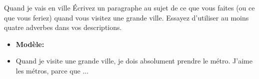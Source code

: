 \begin{frame}{Quand je vais en ville}
  Écrivez un paragraphe au sujet de ce que vous faites (ou ce que vous feriez) quand vous visitez une grande ville.
  Essayez d'utiliser au moins  quatre \alert{adverbes} dans vos descriptions.
  \begin{itemize}
    \item[] \textbf{Modèle:}
    \item Quand je visite une grande ville, je dois \alert{absolument} prendre le métro. J'aime les métros, parce que ...
  \end{itemize}
\end{frame}